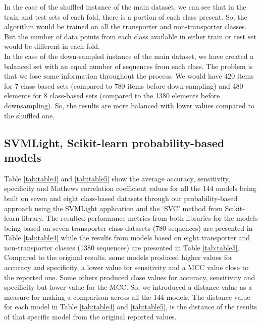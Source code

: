     In the case of the shuffled instance of the main dataset, we can see that in the train and test sets of 
    each fold, there is a portion of each class present. So, the algorithm would be trained on all the 
    transporter and non-transporter classes. But the number of data points from each class available in either train or 
    test set would be different in each fold.\\

    In the case of the down-sampled instance of the main dataset, we have created a balanced set with an equal number of 
    sequences from each class. The problem is that we lose some information throughout the process. We would have 420 items 
    for 7 class-based sets (compared to 780 items before down-sampling) and 480 elements for 8 class-based sets 
    (compared to the 1380 elements before downsampling). So, the results are more balanced with lower values compared to the 
    shuffled one.\\

% 

\subsection{SVMLight, Scikit-learn probability-based models}
    Table \ref{tab:table4} and \ref{tab:table5} show the average accuracy, sensitivity, specificity and 
    Mathews correlation coefficient values for all the 144 models being built on seven and eight class-based datasets 
    through our probability-based approach using the SVMLight application and the `SVC' method from Scikit-learn library. 
    The resulted performance metrics from both libraries for the models being based on seven transporter class datasets 
    (780 sequences) are presented in Table \ref{tab:table4} while the results from models based on eight transporter and non-transporter 
    classes (1380 sequences) are presented in Table \ref{tab:table5}.\\

    Compared to the original results, some models produced higher values for accuracy and specificity, a lower value for 
    sensitivity and a MCC value close to the reported one. Some others produced close values for accuracy, sensitivity 
    and specificity but lower value for the MCC. So, we introduced a distance value as a measure for making a comparison 
    across all the 144 models. The distance value for each model in Table \ref{tab:table4} and \ref{tab:table5}, 
    is the distance of the results of that specific model from the original reported values.\\
    
